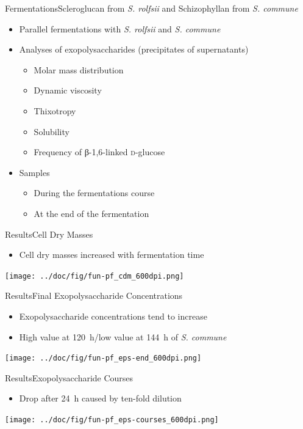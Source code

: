 \documentclass[mathserif]{beamer}
\newcommand{\SIh}[1]{\SI{#1}{\hour}} %
\newcommand{\mo}[1]{\emph{#1}} %
\newcommand{\rolf}{\mo{S. rolfsii}}
\newcommand{\comm}{\mo{S. commune}}
\newcommand{\EPS}{Exopolysaccharide}
\newcommand{\eps}{exopolysaccharide}
\newcommand{\glc}{\textsc{d}-glu\-cose}
\newcommand{\SCL}{Scleroglucan}
\newcommand{\SHZ}{Schizophyllan}
\begin{document}
\begin{frame}{Fermentations}{\SCL{} from \rolf{} and \SHZ{} from \comm{}}
	\begin{itemize}
		\item Parallel fermentations with \rolf{} and \comm{}
		\item Analyses of \eps{}s (precipitates of supernatants)
		\pause
			\begin{itemize}
				\item Molar mass distribution
				\pause
				\item Dynamic viscosity
				\item Thixotropy
				\pause
				\item Solubility
				\pause
				\item Frequency of β-1,6-linked \glc{}
			\end{itemize}
		\pause
		\item Samples
			\begin{itemize}
				\item During the fermentations course
				\item At the end of the fermentation
			\end{itemize}
	\end{itemize}
\end{frame}

\begin{frame}{Results}{Cell Dry Masses}
	\begin{itemize}
		\item Cell dry masses increased with fermentation time
	\end{itemize}
	\begin{center}
		\texttt{[image: ../doc/fig/fun-pf\_cdm\_600dpi.png]}
	\end{center}
\end{frame}

\begin{frame}{Results}{Final \EPS{} Concentrations}
	\begin{itemize}
		\item \EPS{} concentrations tend to increase
		\item High value at \SIh{120}/low value at \SIh{144} of \comm{}
	\end{itemize}
	\begin{center}
		\texttt{[image: ../doc/fig/fun-pf\_eps-end\_600dpi.png]}
	\end{center}
\end{frame}

\begin{frame}{Results}{\EPS{} Courses}
	\begin{itemize}
		\item Drop after \SIh{24} caused by ten-fold dilution
	\end{itemize}
	\begin{center}
		\texttt{[image: ../doc/fig/fun-pf\_eps-courses\_600dpi.png]}
	\end{center}
\end{frame}
\end{document}
